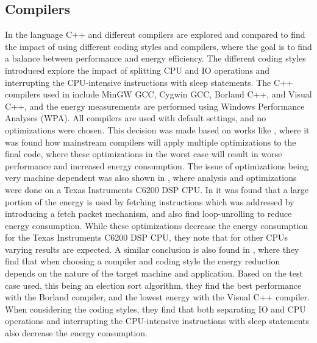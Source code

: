 \subsection{Compilers}
In \cite{hassan2017} the language C++ and different compilers are explored and compared to find the impact of using different coding styles and compilers, where the goal is to find a balance between performance and energy efficiency. The different coding styles introduced explore the impact of splitting CPU and IO operations and interrupting the CPU-intensive instructions with sleep statements. The C++ compilers used in \cite{hassan2017} include MinGW GCC, Cygwin GCC, Borland C++, and Visual C++, and the energy measurements are performed using Windows Performance Analyses (WPA). All compilers are used with default settings, and no optimizations were chosen. This decision was made based on works like \cite{lima2013}, where it was found how mainstream compilers will apply multiple optimizations to the final code, where these optimizations in the worst case will result in worse performance and increased energy consumption. The issue of optimizations being very machine dependent was also shown in \cite{cooper2004}, where analysis and optimizations were done on a Texas Instruments C6200 DSP CPU. In \cite{cooper2004} it was found that a large portion of the energy is used by fetching instructions which was addressed by introducing a fetch packet mechanism, and also find loop-unrolling to reduce energy consumption. While these optimizations decrease the energy consumption for the Texas Instruments C6200 DSP CPU, they note that for other CPUs varying results are expected. A similar conclusion is also found in \cite{hassan2017}, where they find that when choosing a compiler and coding style the energy reduction depends on the nature of the target machine and application. Based on the test case used, this being an election sort algorithm, they find the best performance with the Borland compiler, and the lowest energy with the Visual C++ compiler. When considering the coding styles, they find that both separating IO and CPU operations and interrupting the CPU-intensive instructions with sleep statements also decrease the energy consumption.